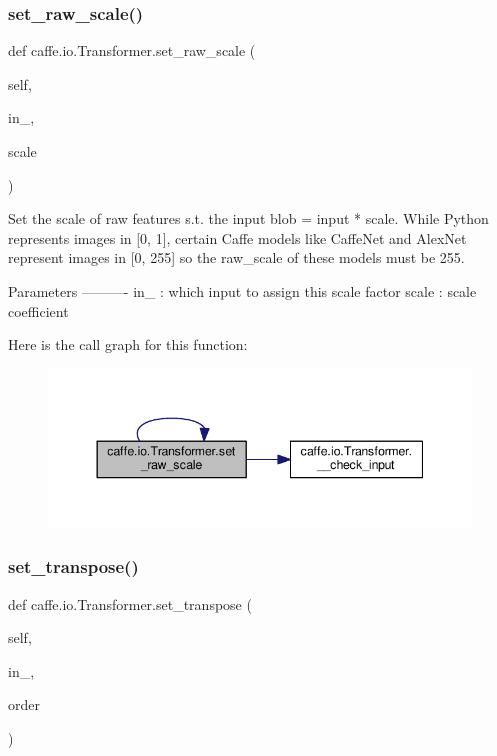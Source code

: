 \subsubsection{\texorpdfstring{set\+\_\+raw\+\_\+scale()}{set\_raw\_scale()}\hspace{0.1cm}{\footnotesize\ttfamily [2/2]}}
{\footnotesize\ttfamily def caffe.\+io.\+Transformer.\+set\+\_\+raw\+\_\+scale (\begin{DoxyParamCaption}\item[{}]{self,  }\item[{}]{in\+\_\+,  }\item[{}]{scale }\end{DoxyParamCaption})}

\begin{DoxyVerb}Set the scale of raw features s.t. the input blob = input * scale.
While Python represents images in [0, 1], certain Caffe models
like CaffeNet and AlexNet represent images in [0, 255] so the raw_scale
of these models must be 255.

Parameters
----------
in_ : which input to assign this scale factor
scale : scale coefficient
\end{DoxyVerb}
 Here is the call graph for this function\+:
\nopagebreak
\begin{figure}[H]
\begin{center}
\leavevmode
\includegraphics[width=344pt]{classcaffe_1_1io_1_1_transformer_aa02e06527de8f0e02d3065bf83b875a9_cgraph}
\end{center}
\end{figure}
\mbox{\label{classcaffe_1_1io_1_1_transformer_af0acba3b0fe23e7fe33228600b18279a}} 
\subsubsection{\texorpdfstring{set\+\_\+transpose()}{set\_transpose()}\hspace{0.1cm}{\footnotesize\ttfamily [1/2]}}
{\footnotesize\ttfamily def caffe.\+io.\+Transformer.\+set\+\_\+transpose (\begin{DoxyParamCaption}\item[{}]{self,  }\item[{}]{in\+\_\+,  }\item[{}]{order }\end{DoxyParamCaption})}

